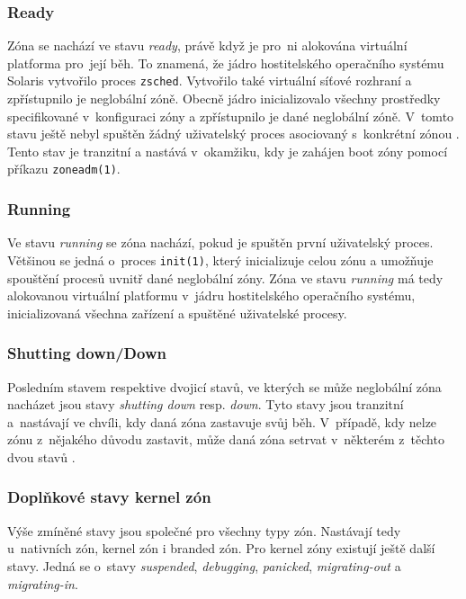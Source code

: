 \subsubsection{Ready}
\label{chapter:zones:administration:states:ready}
Zóna se nachází ve stavu \textit{ready}, právě když je pro~ni alokována virtuální platforma pro~její běh. To znamená, že jádro
hostitelského operačního systému Solaris vytvořilo proces \verb|zsched|. Vytvořilo také virtuální síťové rozhraní a zpřístupnilo
je neglobální zóně. Obecně jádro inicializovalo všechny prostředky specifikované v~konfiguraci zóny a zpřístupnilo je dané
neglobální zóně. V~tomto stavu ještě nebyl spuštěn žádný uživatelský proces asociovaný s~konkrétní zónou \cite{oracle:solaris:zones:states}.
Tento stav je tranzitní a nastává v~okamžiku, kdy je zahájen boot zóny pomocí příkazu \verb|zoneadm(1)|.
\subsubsection{Running}
\label{chapter:zones:administration:states:running}
Ve stavu \textit{running} se zóna nachází, pokud je spuštěn první uživatelský proces. Většinou se jedná o~proces \verb|init(1)|,
který inicializuje celou zónu a umožňuje spouštění procesů uvnitř dané neglobální zóny. Zóna ve stavu \textit{running} má tedy
alokovanou virtuální platformu v~jádru hostitelského operačního systému, inicializovaná všechna zařízení a spuštěné uživatelské
procesy.
\subsubsection{Shutting down/Down}
\label{chapter:zones:administration:states:down}
Posledním stavem respektive dvojicí stavů, ve kterých se může neglobální zóna nacházet jsou stavy \textit{shutting down} resp. 
\textit{down}. Tyto stavy jsou tranzitní a~nastávají ve chvíli, kdy daná zóna zastavuje svůj běh. V~případě, kdy nelze zónu
z~nějakého důvodu zastavit, může daná zóna setrvat v~některém z~těchto dvou stavů \cite{oracle:solaris:zones:states}. 
\subsubsection{Doplňkové stavy kernel zón}
\label{chapter:zones:administration:states:kernel_zones}
Výše zmíněné stavy jsou společné pro všechny typy zón. Nastávají tedy u~nativních zón, kernel zón i branded zón. Pro kernel
zóny existují ještě další stavy. Jedná se o~stavy \textit{suspended}, \textit{debugging}, \textit{panicked}, \textit{migrating-out}
a \textit{migrating-in}.
